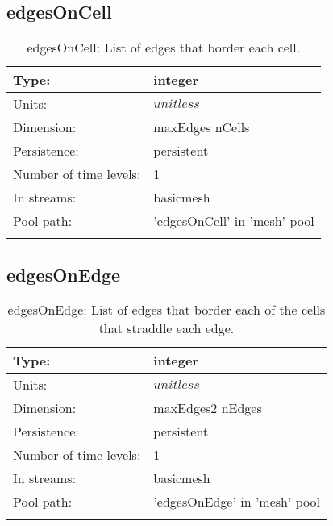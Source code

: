 \subsection[edgesOnCell]{edgesOnCell}
\label{subsec:var_sec_mesh_edgesOnCell}
\begin{center}
\begin{longtable}{| p{2.0in} | p{4.0in} |}
        \hline 
        Type: & integer \\
        \hline 
        Units: & $unitless$ \\
        \hline 
        Dimension: & maxEdges nCells \\
        \hline 
        Persistence: & persistent \\
        \hline 
        Number of time levels: & 1 \\
        \hline 
		 In streams: &  basicmesh \\
        \hline 
            Pool path: & 'edgesOnCell' in 'mesh' pool
 \\
		 \hline 
    \caption{edgesOnCell: List of edges that border each cell.}
\end{longtable}
\end{center}
\subsection[edgesOnEdge]{edgesOnEdge}
\label{subsec:var_sec_mesh_edgesOnEdge}
\begin{center}
\begin{longtable}{| p{2.0in} | p{4.0in} |}
        \hline 
        Type: & integer \\
        \hline 
        Units: & $unitless$ \\
        \hline 
        Dimension: & maxEdges2 nEdges \\
        \hline 
        Persistence: & persistent \\
        \hline 
        Number of time levels: & 1 \\
        \hline 
		 In streams: &  basicmesh \\
        \hline 
            Pool path: & 'edgesOnEdge' in 'mesh' pool
 \\
		 \hline 
    \caption{edgesOnEdge: List of edges that border each of the cells that straddle each edge.}
\end{longtable}
\end{center}
